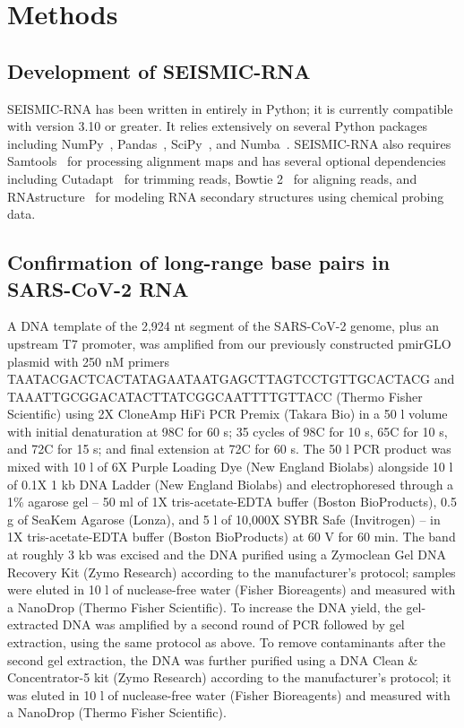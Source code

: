 \documentclass[main.tex]{subfiles}
\begin{document}
\section{Methods}
\label{methods}


\subsection{Development of SEISMIC-RNA}

SEISMIC-RNA has been written in entirely in Python; it is currently compatible with version 3.10 or greater.
It relies extensively on several Python packages including NumPy~\cite{Harris2020}, Pandas~\cite{McKinney2010,Reback2020}, SciPy~\cite{Virtanen2020}, and Numba~\cite{Lam2015}.
SEISMIC-RNA also requires Samtools~\cite{Li2009} for processing alignment maps and has several optional dependencies including Cutadapt~\cite{Martin2011} for trimming reads, Bowtie 2~\cite{Langmead2012} for aligning reads, and RNAstructure~\cite{Reuter2010} for modeling RNA secondary structures using chemical probing data.


\subsection{Confirmation of long-range base pairs in SARS-CoV-2 RNA}

A DNA template of the 2,924 nt segment of the SARS-CoV-2 genome, plus an upstream T7 promoter, was amplified from our previously constructed pmirGLO plasmid \cite{Lan2022} with 250 nM primers TAATACGACTCACTATAGAATAATGAGCTTAGTCCTGTTGCACTACG and TAAATTGCGGACATACTTATCGGCAATTTTGTTACC (Thermo Fisher Scientific) using 2X CloneAmp HiFi PCR Premix (Takara Bio) in a 50 \textmu l volume with initial denaturation at 98\textdegree C for 60 s; 35 cycles of 98\textdegree C for 10 s, 65\textdegree C for 10 s, and 72\textdegree C for 15 s; and final extension at 72\textdegree C for 60 s.
The 50 \textmu l PCR product was mixed with 10 \textmu l of 6X Purple Loading Dye (New England Biolabs) alongside 10 \textmu l of 0.1X 1 kb DNA Ladder (New England Biolabs) and electrophoresed through a 1\% agarose gel -- 50 ml of 1X tris-acetate-EDTA buffer (Boston BioProducts), 0.5 g of SeaKem Agarose (Lonza), and 5 \textmu l of 10,000X SYBR Safe (Invitrogen) -- in 1X tris-acetate-EDTA buffer (Boston BioProducts) at 60 V for 60 min.
The band at roughly 3 kb was excised and the DNA purified using a Zymoclean Gel DNA Recovery Kit (Zymo Research) according to the manufacturer's protocol; samples were eluted in 10 \textmu l of nuclease-free water (Fisher Bioreagents) and measured with a NanoDrop (Thermo Fisher Scientific).
To increase the DNA yield, the gel-extracted DNA was amplified by a second round of PCR followed by gel extraction, using the same protocol as above.
To remove contaminants after the second gel extraction, the DNA was further purified using a DNA Clean \& Concentrator-5 kit (Zymo Research) according to the manufacturer's protocol; it was eluted in 10 \textmu l of nuclease-free water (Fisher Bioreagents) and measured with a NanoDrop (Thermo Fisher Scientific).
\end{document}
